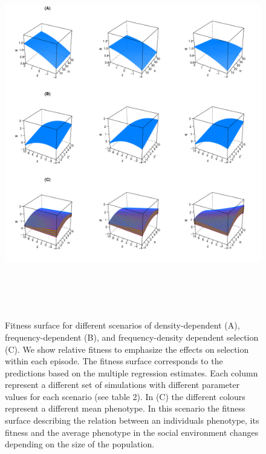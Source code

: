 \documentclass{article}
\begin{document}
\begin{figure}[h] 
	\centering
	\includegraphics[width=16cm, height=16cm]{Figures/Fig5.pdf}
	\caption{Fitness surface for different scenarios of density-dependent (A), frequency-dependent (B), and frequency-density dependent selection (C). We show relative fitness to emphasize the effects on selection within each episode. The fitness surface corresponds to the predictions based on the multiple regression estimates. Each column represent a different set of simulations with different parameter values for each scenario (see table 2). In (C) the different colours represent a different mean phenotype. In this scenario the fitness surface describing the relation between an individuals phenotype, its fitness and the average phenotype in the social environment changes depending on the size of the population.} 
	\label{fig:surface}
\end{figure}
\end{document}
